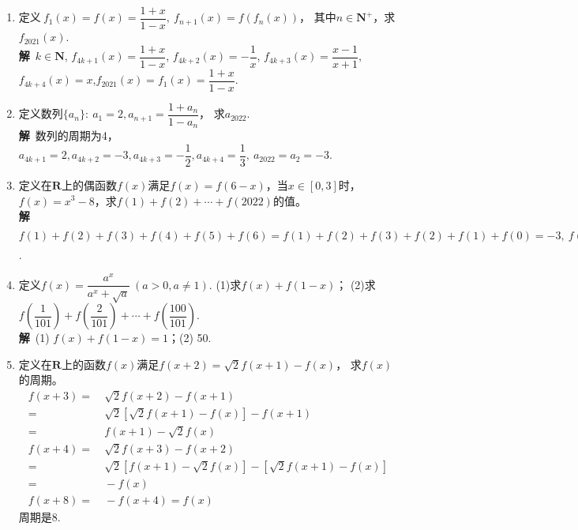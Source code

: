 \begin{enumerate}[label={\textbf{\arabic*.}},leftmargin=
    \inteval{\myenumleftmargin}pt]
\item 定义$\ f_1(x)=f(x)=\dfrac{1+x}{1-x},\ f_{n+1}(x)=f(f_n(x)) $，
其中$ n \in \textbf{N}^+ $，求$ f_{2021}(x) $. 
\ifteach \\ \textbf{解}\ 
$ k\in \textbf{N} $, $ f_{4k+1}(x)=\dfrac{1+x}{1-x} $,
$ f_{4k+2}(x)=-\dfrac{1}{x} $, $ f_{4k+3}(x)=\dfrac{x-1}{x+1} $,
$ f_{4k+4}(x)=x $,$ f_{2021}(x)=f_1(x)=\dfrac{1+x}{1-x} $. 
\fi

\item 定义数列$ \{a_n\}:\ a_1=2,a_{n+1}=\dfrac{1+a_n}{1-a_n} $，
求$ a_{2022} $. 
\ifteach \\
\textbf{解}\ 数列的周期为4，$ a_{4k+1}=2,a_{4k+2}=-3,a_{4k+3}
=-\dfrac{1}{2},a_{4k+4}=\dfrac{1}{3},\ a_{2022}=a_2=-3 $. 
\fi


\item 定义在$ \textbf{R} $上的偶函数$ f(x) $满足$ f(x)=f(6-x) $，当$ x\in [0,3] $时，
$ f(x)=x^3-8 $，求$ f(1)+f(2)+\cdots +f(2022) $的值。
\ifteach \\ \textbf{解}\ 
$ f(1)+f(2)+f(3)+f(4)+f(5)+f(6)=f(1)+f(2)+f(3)+f(2)+f(1)+f(0)=-3,\ 
f(1)+f(2)+\cdots +f(2022)=\dfrac{2022}{6}[f(1)+f(2)+\cdots+f(6)]=-1011 $. 
\fi

\item 定义$ f(x)=\dfrac{a^x}{a^x+\sqrt{a}} \ (a>0,a\neq 1)$. 
(1)求$ f(x)+f(1-x) $；
(2)求$ f\left(\dfrac{1}{101}\right)+f\left(\dfrac{2}{101}\right)+
\cdots +f\left(\dfrac{100}{101}\right) $. 
\ifteach \\ \textbf{解}\ 
(1) $ f(x)+f(1-x)=1 $；\quad (2) 50.
\fi

\item 定义在$ \textbf{R} $上的函数$ f(x) $满足$ f(x+2)=\sqrt{2}f(x+1)-f(x) $，
求$ f(x) $的周期。
\ifteach 
\begin{align*}
    f(x+3) =&\ \sqrt{2}f(x+2)-f(x+1) \\
    =&\  \sqrt{2}[\sqrt{2}f(x+1)-f(x)]-f(x+1) \\
    =&\ f(x+1)-\sqrt{2}f(x) \\
    f(x+4) =&\ \sqrt{2}f(x+3)-f(x+2) \\
    =&\  \sqrt{2}[f(x+1)-\sqrt{2}f(x)]-[\sqrt{2}f(x+1)-f(x)] \\
    =&\ -f(x) \\
    f(x+8)=&\ -f(x+4)=f(x)
\end{align*} 
周期是8.
\fi


\end{enumerate}
